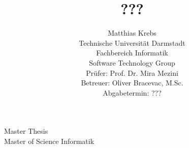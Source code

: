 \documentclass[a4paper, twoside]{report}
\begin{document}

\begin{center}
  Master Thesis\\
  Master of Science Informatik
\end{center}

\title{???}
\author{
Matthias Krebs \\[6cm]
\small Technische Universität Darmstadt \\
\small Fachbereich Informatik \\
\small Software Technology Group \\[0.5cm]
\small Prüfer: Prof. Dr. Mira Mezini \\
\small Betreuer: Oliver Bracevac, M.Sc. \\[0.5cm]
\small Abgabetermin: ???
}
\date{} %

\begingroup
\let\newpage\relax %
\maketitle
\endgroup
\end{document}
